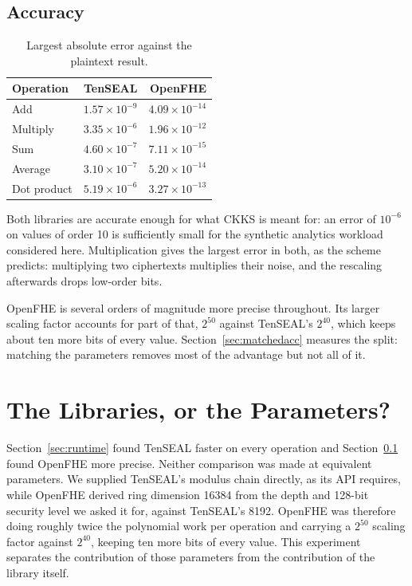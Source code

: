 \documentclass[11pt,a4paper]{article}
\begin{document}
\subsection{Accuracy}\label{sec:accuracy}

\begin{table}[H]\centering\small
\begin{tabular}{@{}lrr@{}}
\toprule
\textbf{Operation} & \textbf{TenSEAL} & \textbf{OpenFHE} \\
\midrule
Add         & $1.57\times10^{-9}$ & $4.09\times10^{-14}$ \\
Multiply    & $3.35\times10^{-6}$ & $1.96\times10^{-12}$ \\
Sum         & $4.60\times10^{-7}$ & $7.11\times10^{-15}$ \\
Average     & $3.10\times10^{-7}$ & $5.20\times10^{-14}$ \\
Dot product & $5.19\times10^{-6}$ & $3.27\times10^{-13}$ \\
\bottomrule
\end{tabular}
\caption{Largest absolute error against the plaintext result.}
\end{table}

Both libraries are accurate enough for what CKKS is meant for: an error of $10^{-6}$
on values of order 10 is sufficiently small for the synthetic analytics workload
considered here. Multiplication gives the largest error in both, as the scheme
predicts: multiplying two ciphertexts multiplies their noise, and the rescaling
afterwards drops low-order bits.

OpenFHE is several orders of magnitude more precise throughout. Its larger scaling
factor accounts for part of that, $2^{50}$ against TenSEAL's $2^{40}$, which keeps
about ten more bits of every value. Section~\ref{sec:matchedacc} measures the split:
matching the parameters removes most of the advantage but not all of it.

\section{The Libraries, or the Parameters?}\label{sec:params}

Section~\ref{sec:runtime} found TenSEAL faster on every operation and
Section~\ref{sec:accuracy} found OpenFHE more precise. Neither comparison was made
at equivalent parameters. We supplied TenSEAL's modulus chain directly, as its API
requires, while OpenFHE derived ring dimension 16384 from the depth and 128-bit
security level we asked it for, against TenSEAL's 8192. OpenFHE was therefore doing
roughly twice the polynomial work per operation and carrying a $2^{50}$ scaling
factor against $2^{40}$, keeping ten more bits of every value. This experiment
separates the contribution of those parameters from the contribution of the library
itself.
\end{document}
